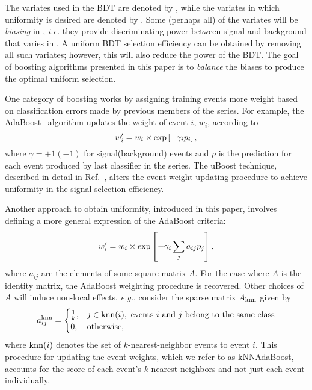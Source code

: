 The variates used in the BDT are denoted by \x, while the variates in which uniformity is desired are denoted by \y.  Some (perhaps all) of the \x variates will be {\em biasing} in \y, {\em i.e.} they provide discriminating power between signal and background that varies in \y.  A uniform BDT selection efficiency can be obtained by removing all such variates; however, this will also reduce the power of the BDT.  The goal of boosting algorithms presented in this paper is to {\em balance} the biases to produce the optimal uniform selection.

One category of boosting works by assigning training events more weight based on classification errors made by previous members of the series.  For example, the AdaBoost~\cite{ref:FS1997} algorithm updates the weight of event $i$, $w_i$, according to
\begin{equation}
w_i^{\prime} = w_i \times {\rm exp}\left[-\gamma_i p_i\right], 
\end{equation}
where $\gamma = +1(-1)$ for signal(background) events and $p$ is the prediction for each event produced by last classifier in the series.  
The uBoost technique, described in detail in Ref.~\cite{ref:uboost}, alters the event-weight updating procedure to achieve uniformity in the signal-selection efficiency. 


Another approach to obtain uniformity, introduced in this paper, involves defining a more general expression of the AdaBoost criteria:
\begin{equation}
 w_i^{\prime} = w_i \times {\rm exp}\left[-\gamma_i \sum_j a_{ij} p_j\right],
\end{equation}
where $a_{ij}$ are the elements of some square matrix $A$.  For the case where $A$ is the identity matrix, the AdaBoost weighting procedure is recovered.  
Other choices of $A$ will induce non-local effects, {\em e.g.}, consider the sparse matrix $A_{\rm knn}$ given by
\begin{equation}
  a_{ij}^{\rm knn} = \begin{cases} 
    \frac{1}{k}, & j \in \text{knn}(i), \text{ events $i$ and $j$ belong to the same class} \\
    0, & \text{otherwise},
\end{cases}
\end{equation}
where $\text{knn}(i)$ denotes the set of $k$-nearest-neighbor events to event $i$.
This procedure for updating the event weights, which we refer to as kNNAdaBoost, accounts for the score of each event's $k$ nearest neighbors and not just each event individually.


